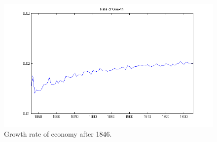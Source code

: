 \documentclass[a4paper,11pt]{article}
\begin{document}
\begin{figure}[h!]
\begin{center}
\includegraphics[scale=.8]{growth_zoom.png}
\caption{Growth rate of economy after 1846.}
\end{center}
\end{figure}
\end{document}
